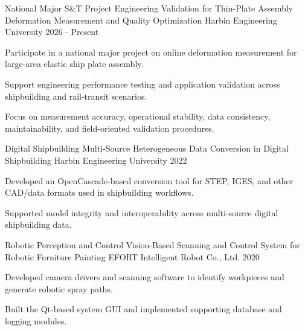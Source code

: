 

\begin{cventries}

  \cventry
    {National Major S\&T Project}
    {Engineering Validation for Thin-Plate Assembly Deformation Measurement and Quality Optimization}
    {Harbin Engineering University}
    {2026 - Present}
    {
      \begin{cvitems}
        \item {Participate in a national major project on online deformation measurement for large-area elastic ship plate assembly.}
        \item {Support engineering performance testing and application validation across shipbuilding and rail-transit scenarios.}
        \item {Focus on measurement accuracy, operational stability, data consistency, maintainability, and field-oriented validation procedures.}
      \end{cvitems}
    }

  \cventry
    {Digital Shipbuilding}
    {Multi-Source Heterogeneous Data Conversion in Digital Shipbuilding}
    {Harbin Engineering University}
    {2022}
    {
      \begin{cvitems}
        \item {Developed an OpenCascade-based conversion tool for STEP, IGES, and other CAD/data formats used in shipbuilding workflows.}
        \item {Supported model integrity and interoperability across multi-source digital shipbuilding data.}
      \end{cvitems}
    }

  \cventry
    {Robotic Perception and Control}
    {Vision-Based Scanning and Control System for Robotic Furniture Painting}
    {EFORT Intelligent Robot Co., Ltd.}
    {2020}
    {
      \begin{cvitems}
        \item {Developed camera drivers and scanning software to identify workpieces and generate robotic spray paths.}
        \item {Built the Qt-based system GUI and implemented supporting database and logging modules.}
      \end{cvitems}
    }


\end{cventries}
